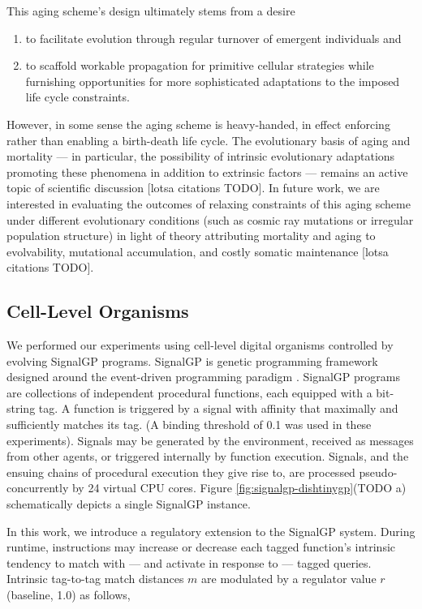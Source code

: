 This aging scheme's design ultimately stems from a desire
\begin{enumerate}
\item to facilitate evolution through regular turnover of emergent individuals and
\item to scaffold workable propagation for primitive cellular strategies while furnishing opportunities for more sophisticated adaptations to the imposed life cycle constraints.
\end{enumerate}
However, in some sense the aging scheme is heavy-handed, in effect enforcing rather than enabling a birth-death life cycle.
The evolutionary basis of aging and mortality --- in particular, the possibility of intrinsic evolutionary adaptations promoting these phenomena in addition to extrinsic factors  --- remains an active topic of scientific discussion [lotsa citations TODO].
In future work, we are interested in evaluating the outcomes of relaxing constraints of this aging scheme under different evolutionary conditions (such as cosmic ray mutations or irregular population structure) in light of theory attributing mortality and aging to evolvability, mutational accumulation, and costly somatic maintenance [lotsa citations TODO].

\subsection{Cell-Level Organisms}



We performed our experiments using cell-level digital organisms controlled by evolving SignalGP programs.
SignalGP is genetic programming framework designed around the event-driven programming paradigm \cite{lalejini2018evolving}.
SignalGP programs are collections of independent procedural functions, each equipped with a bit-string tag.
A function is triggered by a signal with affinity that maximally and sufficiently matches its tag.
(A binding threshold of 0.1 was used in these experiments).
Signals may be generated by the environment, received as messages from other agents, or triggered internally by function execution.
Signals, and the ensuing chains of procedural execution they give rise to, are processed pseudo-concurrently by 24 virtual CPU cores.
Figure \ref{fig:signalgp-dishtinygp}(TODO a) schematically depicts a single SignalGP instance.

In this work, we introduce a regulatory extension to the SignalGP system.
During runtime, instructions may increase or decrease each tagged function's intrinsic tendency to match with --- and activate in response to --- tagged queries.
Intrinsic tag-to-tag match distances $m$ are modulated by a regulator value $r$ (baseline, 1.0) as follows,

